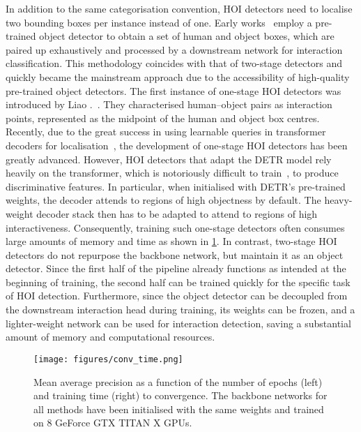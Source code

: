 \documentclass[10pt,twocolumn,letterpaper]{article}
\begin{document}
In addition to the same categorisation convention, HOI detectors need to localise two bounding boxes per instance instead of one. Early works~\cite{hicodet,gpnn,no-frills,tin} employ a pre-trained object detector to obtain a set of human and object boxes, which are paired up exhaustively and processed by a downstream network for interaction classification. This methodology coincides with that of two-stage detectors and quickly became the mainstream approach due to the accessibility of high-quality pre-trained object detectors.
The first instance of one-stage HOI detectors was introduced by Liao \etal.~\cite{ppdm}. They characterised human--object pairs as interaction points, represented as the midpoint of the human and object box centres. Recently, due to the great success in using learnable queries in transformer decoders for localisation~\cite{detr}, the development of one-stage HOI detectors has been greatly advanced. However, HOI detectors that adapt the DETR model rely heavily on the transformer, which is notoriously difficult to train~\cite{train-xfmer}, to produce discriminative features. In particular, when initialised with DETR's pre-trained weights, the decoder attends to regions of high objectness by default. The heavy-weight decoder stack then has to be adapted to attend to regions of high interactiveness. Consequently, training such one-stage detectors often consumes large amounts of memory and time as shown in \cref{fig:convg-time}.
In contrast, two-stage HOI detectors do not repurpose the backbone network, but maintain it as an object detector. Since the first half of the pipeline already functions as intended at the beginning of training, the second half can be trained quickly for the specific task of HOI detection. Furthermore, since the object detector can be decoupled from the downstream interaction head during training, its weights can be frozen, and a lighter-weight network can be used for interaction detection, saving a substantial amount of memory and computational resources.
\begin{figure}[t]
    \centering
    \texttt{[image: figures/conv\_time.png]}
    \caption{Mean average precision as a function of the number of epochs (left) and training time (right) to convergence. The backbone networks for all methods have been initialised with the same weights and trained on 8 GeForce GTX TITAN X GPUs.}
    \label{fig:convg-time}
\end{figure}
\end{document}
